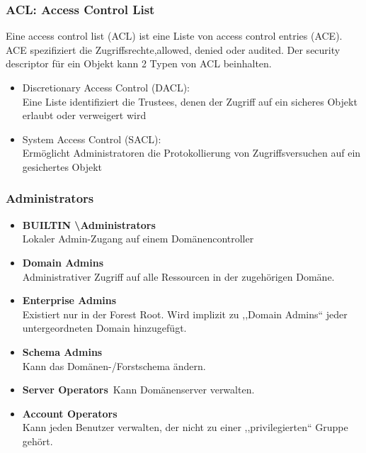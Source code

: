 \subsubsection{ACL: Access Control List}
Eine access control list (ACL) ist eine Liste von access control entries (ACE). ACE spezifiziert die Zugriffsrechte,allowed, denied oder audited. Der security descriptor für ein Objekt kann 2 Typen von ACL beinhalten.
\begin{itemize}
    \item Discretionary Access Control (DACL):\\
    Eine Liste identifiziert die Trustees, denen der Zugriff auf ein sicheres Objekt erlaubt oder verweigert wird
    \item System Access Control (SACL):\\
    Ermöglicht Administratoren die Protokollierung von Zugriffsversuchen auf ein gesichertes Objekt
\end{itemize}

\subsubsection{Administrators}
\begin{itemize}
    \item \textbf{BUILTIN \textbackslash Administrators}\\
    Lokaler Admin-Zugang auf einem Domänencontroller
    \item \textbf{Domain Admins}\\
    Administrativer Zugriff auf alle Ressourcen in der zugehörigen Domäne.
    \item \textbf{Enterprise Admins}\\
    Existiert nur in der Forest Root. Wird implizit zu ,,Domain Admins`` jeder untergeordneten Domain hinzugefügt.
    \item \textbf{Schema Admins}\\
    Kann das Domänen-/Forstschema ändern.
    \item \textbf{Server Operators}\
    Kann Domänenserver verwalten.
    \item \textbf{Account Operators}\\
    Kann jeden Benutzer verwalten, der nicht zu einer ,,privilegierten`` Gruppe gehört.
\end{itemize}

